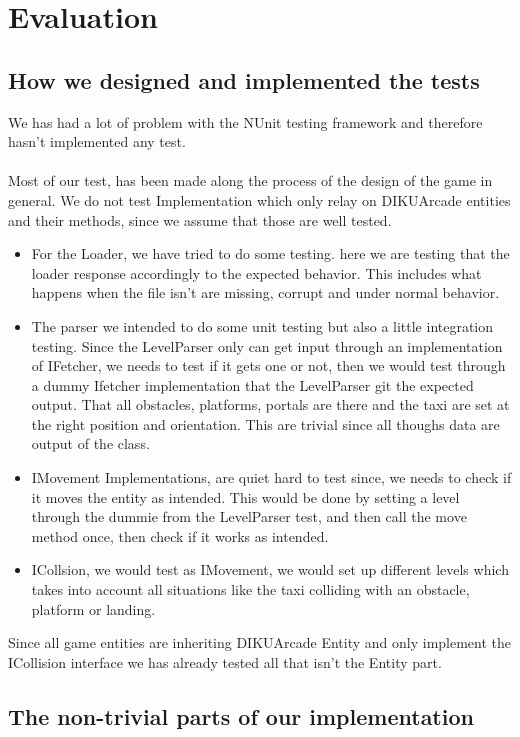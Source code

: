 \documentclass[../master.tex]{subfile}
\begin{document}
\section{Evaluation}
\subsection{How we designed and implemented the tests}
We has had a lot of problem with the NUnit testing framework and therefore hasn't implemented any test.  
\\
\\
Most of our test, has been made along the process of the design of the game in general. We do not test Implementation which only relay on DIKUArcade entities and their methods, since we assume that those are well tested.
\begin{itemize}
\item For the Loader, we have tried to do some testing. here we are testing that the loader response accordingly to the expected behavior. This includes what happens when the file isn't are missing, corrupt and under normal behavior.
\item The parser we intended to do some unit testing but also a little integration testing. Since the LevelParser only can get input through an implementation of IFetcher, we needs to test if it gets one or not, then we would test through a dummy Ifetcher implementation that the LevelParser git the expected output. That all obstacles, platforms, portals are there and the taxi are set at the right position and orientation. This are trivial since all thoughs data are output of the class.
\item IMovement Implementations, are quiet hard to test since, we needs to check if it moves the entity as intended. This would be done by setting a level through the dummie from the LevelParser test, and then call the move method once, then check if it works as intended.
\item ICollsion, we would test as IMovement, we would set up different levels which takes into account all situations like the taxi colliding with an obstacle, platform or landing.

\end{itemize}
Since all game entities are inheriting DIKUArcade Entity and only implement the ICollision interface we has already tested all that isn't the Entity part.

\subsection{The non-trivial parts of our implementation}
\end{document}
